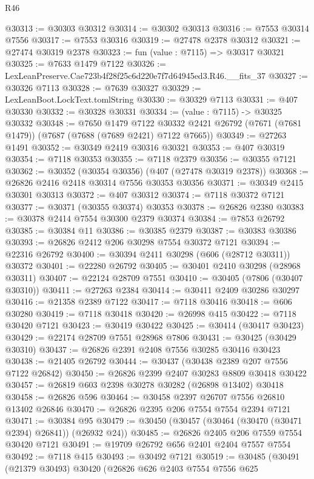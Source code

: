 \begin{lexlean}{R46}
\begin{coremodule}
@30313 := @30303 @30312
@30314 := @30302 @30313
@30316 := @7553 @30314 @7556
@30317 := @7553 @30316
@30319 := @27478 @2378 @30312
@30321 := @27474 @30319 @2378
@30323 := fun (value : @7115) => @30317 @30321
@30325 := @7633 @1479 @7122
@30326 := LexLeanPreserve.Cae723b4f28f25c6d220e7f7d64945ed3.R46.__fits_37
@30327 := @30326 @7113
@30328 := @7639 @30327
@30329 := LexLeanBoot.LockText.tomlString
@30330 := @30329 @7113
@30331 := @407 @30330
@30332 := @30328 @30331
@30334 := (value : @7115) -> @30325 @30332
@30348 := @7650
    @1479
    @7122
    @30332
    @2421
    @26792
    (@7671 (@7681 @1479))
    (@7687 (@7688 (@7689 @2421) @7122 @7665))
@30349 := @27263 @1491
@30352 := @30349 @2419 @30316 @30321
@30353 := @407 @30319
@30354 := @7118 @30353
@30355 := @7118 @2379
@30356 := @30355 @7121
@30362 := @30352 (@30354 @30356) (@407 (@27478 @30319 @2378))
@30368 := @26826 @2416 @2418 @30314 @7556 @30353 @30356
@30371 := @30349 @2415 @30301 @30313
@30372 := @407 @30312
@30374 := @7118 @30372 @7121
@30377 := @30371 (@30355 @30374) @30353
@30378 := @26826 @2380
@30383 := @30378 @2414 @7554 @30300 @2379 @30374
@30384 := @7853 @26792
@30385 := @30384 @11
@30386 := @30385 @2379
@30387 := @30383 @30386
@30393 := @26826 @2412 @206 @30298 @7554 @30372 @7121
@30394 := @22316 @26792
@30400 := @30394 @2411 @30298 (@606 (@28712 @30311)) @30372
@30401 := @22280 @26792
@30405 := @30401 @2410 @30298 (@28968 @30311)
@30407 := @22124 @28709 @7551
@30410 := @30405 (@7806 (@30407 @30310))
@30411 := @27263 @2384
@30414 := @30411 @2409 @30286 @30297
@30416 := @21358 @2389 @7122
@30417 := @7118 @30416
@30418 := @606 @30280
@30419 := @7118 @30418
@30420 := @26998 @415
@30422 := @7118 @30420 @7121
@30423 := @30419 @30422
@30425 := @30414 (@30417 @30423)
@30429 := @22174 @28709 @7551 @28968 @7806
@30431 := @30425 (@30429 @30310)
@30437 := @26826 @2391 @2408 @7556 @30285 @30416 @30423
@30438 := @21405 @26792
@30444 := @30437 (@30438 @2389 @207 @7556 @7122 @26842)
@30450 := @26826 @2399 @2407 @30283 @8809 @30418 @30422
@30457 := @26819 @603 @2398 @30278 @30282 (@26898 @13402) @30418
@30458 := @26826 @596
@30464 := @30458 @2397 @26707 @7556 @26810 @13402 @26846
@30470 := @26826 @2395 @206 @7554 @7554 @2394 @7121
@30471 := @30384 @95
@30479 := @30450 (@30457 (@30464 (@30470 (@30471 @2394) @26841)) (@26932 @24))
@30485 := @26826 @2405 @206 @7559 @7554 @30420 @7121
@30491 := @19709 @26792 @656 @2401 @2404 @7557 @7554
@30492 := @7118 @415
@30493 := @30492 @7121
@30519 := @30485
    (@30491
      (@21379 @30493)
      @30420
      (@26826
        @626
        @2403
        @7554
        @7556
        @625

\end{coremodule}
\end{lexlean}
